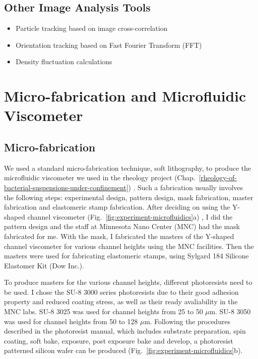 \subsection{Other Image Analysis Tools}

\begin{itemize}
	\item Particle tracking based on image cross-correlation
	\item Orientation tracking based on Fast Fourier Transform (FFT)
	\item Density fluctuation calculations
\end{itemize}


\section{Micro-fabrication and Microfluidic Viscometer}
\label{micro-fabrication-and-microfluidics}

\subsection{Micro-fabrication}

We used a standard micro-fabrication technique, soft lithography, to produce the microfluidic viscometer we used in the rheology project (Chap.~\ref{rheology-of-bacterial-suspensions-under-confinement}) \cite{Qin2010}. Such a fabrication usually involves the following steps: experimental design, pattern design, mask fabrication, master fabrication and elastomeric stamp fabrication.
After deciding on using the Y-shaped channel viscometer (Fig.~\ref{fig:experiment-microfluidics}a) \cite{Gachelin2013}, I did the pattern design and the staff at Minnesota Nano Center (MNC) had the mask fabricated for me. With the mask, I fabricated the masters of the Y-shaped channel viscometer for various channel heights using the MNC facilities. Then the masters were used for fabricating elastomeric stamps, using Sylgard 184 Silicone Elastomer Kit (Dow Inc.).

To produce masters for the various channel heights, different photoresists need to be used. I chose the SU-8 3000 series photoresists due to their good adhesion property and reduced coating stress, as well as their ready avaliability in the MNC labs. SU-8 3025 was used for channel heights from 25 to 50 $\mu$m. SU-8 3050 was used for channel heights from 50 to 128 $\mu$m. Following the procedures described in the photoresist manual, which includes substrate preparation, spin coating, soft bake, exposure, post exposure bake and develop, a photoresist patterned silicon wafer can be produced (Fig.~\ref{fig:experiment-microfluidics}b).

